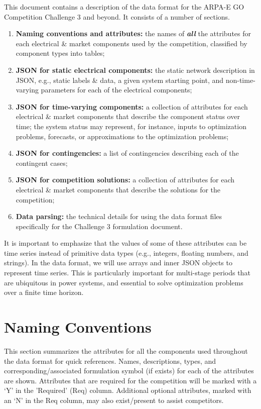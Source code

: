 \documentclass{article}
\begin{document}
This document contains a description of the data format for the ARPA-E GO Competition Challenge 3 and beyond. It consists of a number of sections.
\begin{enumerate}[I]
    \item {\bf Naming conventions and attributes:} the names of \textit{\textbf{all}} the attributes for each electrical \& market components used by the competition, classified by component types into tables;

    \item {\bf JSON for static electrical components:} the static network description in JSON, e.g., static labels \& data, a given system starting point, and non-time-varying parameters for each of the electrical components;

    \item {\bf JSON for time-varying components:} a collection of attributes for each electrical \& market components that describe the component status over time; the system status may represent, for instance, inputs to optimization problems,  forecasts, or approximations to the optimization problems;
    \item {\bf JSON for contingencies:} a list of contingencies describing each of the contingent cases;
    \item {\bf JSON for competition solutions:} a collection of attributes for each electrical \& market components that describe the solutions for the competition;
     \item {\bf Data parsing:}
     the technical details for using the data format files specifically for the Challenge 3 formulation document.
\end{enumerate}
It is important to emphasize that the values of some of these attributes can be time series instead of primitive data types (e.g., integers, floating numbers, and strings).
In the data format, we will use arrays and inner JSON objects to represent time series.
This is particularly important for multi-stage periods that are ubiquitous in power systems, and essential
to solve optimization problems over a finite time horizon.


\section{Naming Conventions}
\label{sec:naming}
This section summarizes the attributes for all the components used throughout the data format for quick references.
Names, descriptions, types, and corresponding/associated formulation symbol (if exists) for each of the attributes are shown.
Attributes that are required for the competition
will be marked with a `Y' in the 'Required' (Req) column.
Additional optional attributes, marked with an `N' in the Req column, may also exist/present to assist competitors.
\end{document}
